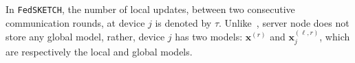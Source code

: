 \documentclass{article} %
\begin{document}
In \texttt{FedSKETCH}, the number of local updates, between two consecutive communication rounds, at device $j$ is denoted by $\tau$.
 Unlike~\cite{haddadpour2020federated}, server node does not store any global model, rather, device $j$ has two models: $\boldsymbol{x}^{(r)}$ and $\boldsymbol{x}^{(\ell,r)}_j$, which are respectively the local and global models. 
%
\end{document}
